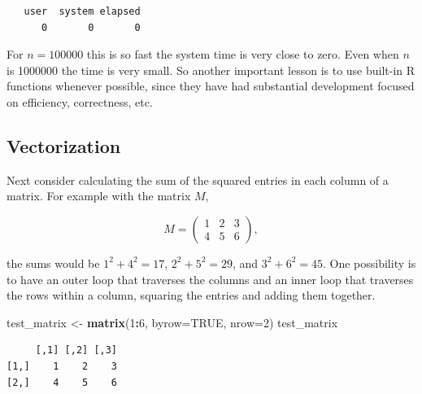\documentclass[
]{krantz}
\makeatletter
\newenvironment{Shaded}{\begin{snugshade}}{\end{snugshade}}
\newcommand{\DataTypeTok}[1]{\textcolor[rgb]{0.27,0.27,0.27}{#1}}
\newcommand{\DecValTok}[1]{\textcolor[rgb]{0.06,0.06,0.06}{#1}}
\newcommand{\KeywordTok}[1]{\textcolor[rgb]{0.27,0.27,0.27}{\textbf{#1}}}
\newcommand{\NormalTok}[1]{#1}
\newcommand{\OperatorTok}[1]{\textcolor[rgb]{0.43,0.43,0.43}{\textbf{#1}}}
\newcommand{\OtherTok}[1]{\textcolor[rgb]{0.37,0.37,0.37}{#1}}
\newcommand{\StringTok}[1]{\textcolor[rgb]{0.5,0.5,0.5}{#1}}
\newenvironment{kframe}{%
\medskip{}
\setlength{\fboxsep}{.8em}
 \def\at@end@of@kframe{}%
 \ifinner\ifhmode%
  \def\at@end@of@kframe{\end{minipage}}%
  \begin{minipage}{\columnwidth}%
 \fi\fi%
 \def\FrameCommand##1{\hskip\@totalleftmargin \hskip-\fboxsep
 \colorbox{shadecolor}{##1}\hskip-\fboxsep
     \hskip-\linewidth \hskip-\@totalleftmargin \hskip\columnwidth}%
 \MakeFramed {\advance\hsize-\width
   \@totalleftmargin\z@ \linewidth\hsize
   \@setminipage}}%
 {\par\unskip\endMakeFramed%
 \at@end@of@kframe}
\renewenvironment{Shaded}{\begin{kframe}}{\end{kframe}}
\makeatother
\begin{document}
\begin{verbatim}
   user  system elapsed 
      0       0       0 
\end{verbatim}

For \(n=100000\) this is so fast the system time is very close to zero. Even when \(n\) is 1000000 the time is very small. So another important lesson is to use built-in R functions whenever possible, since they have had substantial development focused on efficiency, correctness, etc.

\hypertarget{vectorization}{%
\subsection{Vectorization}\label{vectorization}}

Next consider calculating the sum of the squared entries in each column of a matrix. For example with the matrix \(M\),

\[
M = \left(\begin{array}{ccc}
1 & 2 & 3 \\
4 & 5 & 6
\end{array}\right),
\]

the sums would be \(1^2 + 4^2 = 17\), \(2^2 + 5^2 = 29\), and \(3^2 + 6^2 = 45\).
One possibility is to have an outer loop that traverses the columns and an inner loop that traverses the rows within a column, squaring the entries and adding them together.

\begin{Shaded}
\begin{Highlighting}[]
\NormalTok{test\_matrix \textless{}{-}}\StringTok{ }\KeywordTok{matrix}\NormalTok{(}\DecValTok{1}\OperatorTok{:}\DecValTok{6}\NormalTok{, }\DataTypeTok{byrow=}\OtherTok{TRUE}\NormalTok{, }\DataTypeTok{nrow=}\DecValTok{2}\NormalTok{)}
\NormalTok{test\_matrix}
\end{Highlighting}
\end{Shaded}

\begin{verbatim}
     [,1] [,2] [,3]
[1,]    1    2    3
[2,]    4    5    6
\end{verbatim}
\end{document}
